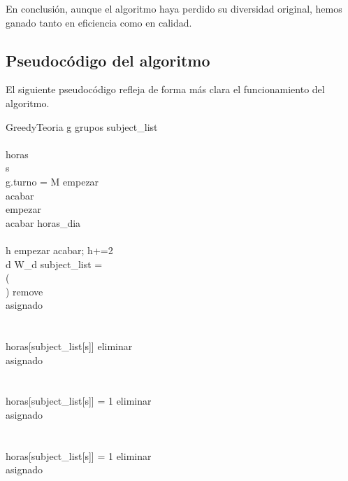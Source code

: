 En conclusión, aunque el algoritmo haya perdido su diversidad original, hemos ganado tanto en eficiencia como en calidad.

\subsection{Pseudocódigo del algoritmo}
El siguiente pseudocódigo refleja de forma más clara el funcionamiento del algoritmo.

\begin{pseudocode}{GreedyTeoria}{ }
\label{greedyteoria}
\FOREACH g \in grupos
\BEGIN
  subject\_list \GETS {}\\
  \\
  horas \GETS {}\\
  s \\

  \IF g.turno = M \THEN
  \BEGIN
    empezar  \\
    acabar \GETS {}\\
  \END
  \ELSE 
  \BEGIN
    empezar \GETS {}\\
    acabar \GETS horas\_dia\\
  \END\\

  \FOR h \GETS empezar \TO acabar; h+=2\\
  \BEGIN
    \FOR d  \TO W_d
    \BEGIN
      \IF subject\_list = \emptyset \THEN
      \BREAK\\

      \ELSEIF \NOT ( \AND \\ \;\;\; ) \THEN
      \BEGIN
        remove \GETS \FALSE\\
        asignado \GETS \FALSE\\
      \END\\

      \ELSEIF {} \AND \\ \;\;\; horas[subject\_list[s]]  \THEN
      \BEGIN
        eliminar \GETS {}\\
        asignado \GETS \TRUE\\
      \END\\

      \ELSEIF {} \AND \\ \;\;\; horas[subject\_list[s]] = 1 \THEN
      \BEGIN
        eliminar \GETS {}\\
        asignado \GETS \TRUE\\
      \END\\
      \ELSEIF {} \AND \\ \;\;\; horas[subject\_list[s]] = 1 \THEN
      \BEGIN
        eliminar \GETS {}\\
        asignado \GETS \TRUE\\
      \END\\


\end{pseudocode}
